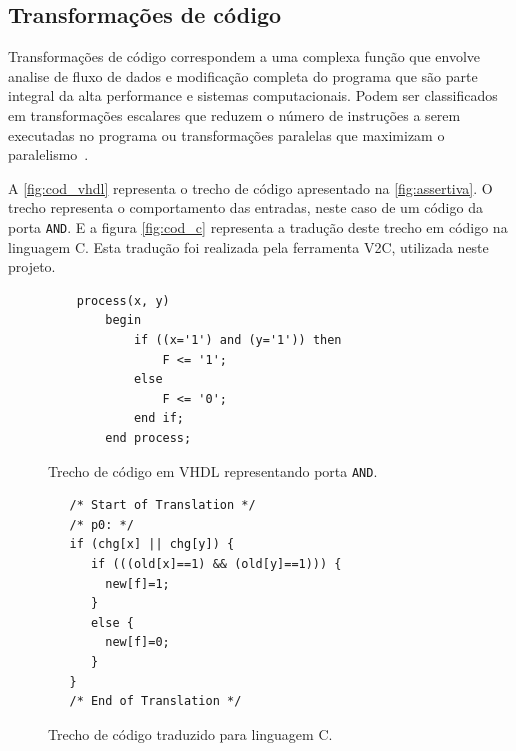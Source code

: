 \subsection{Transformações de código}
\par
Transformações de código correspondem a uma complexa função que envolve analise de fluxo de dados e modificação completa do programa que são parte integral da alta performance e sistemas computacionais. Podem ser classificados em transformações escalares que reduzem o número de instruções a serem executadas no programa ou transformações paralelas que maximizam o paralelismo~\cite{srikant2002compiler}.

\par
A \autoref{fig:cod_vhdl} representa o trecho de código apresentado na \autoref{fig:assertiva}. O trecho representa o comportamento das entradas, neste caso de um código da porta \texttt{AND}. E a figura \autoref{fig:cod_c} representa a tradução deste trecho em código na linguagem C. Esta tradução foi realizada pela ferramenta V2C, utilizada neste projeto.

\begin{figure}[thp]
\caption{\label{fig:cod_vhdl} Trecho de código em VHDL representando porta \texttt{AND}.}
	\begin{center}
    \begin{minipage}{0.9\textwidth}
    \begin{lstlisting}       
	process(x, y)
    	begin
        	if ((x='1') and (y='1')) then
            	F <= '1';
        	else
            	F <= '0';
        	end if;
    	end process;
\end{lstlisting}
    \end{minipage}
	\end{center}
\end{figure}

\begin{figure}[thp]
\caption{\label{fig:cod_c} Trecho de código traduzido para linguagem C.}
	\begin{center}
    \begin{minipage}{0.9\textwidth}
    \begin{lstlisting}       
   /* Start of Translation */
   /* p0: */
   if (chg[x] || chg[y]) {
      if (((old[x]==1) && (old[y]==1))) {
      	new[f]=1;
      }
      else {
      	new[f]=0;
      }
   }
   /* End of Translation */

	\end{lstlisting}
    \end{minipage}
	\end{center}
\end{figure}

